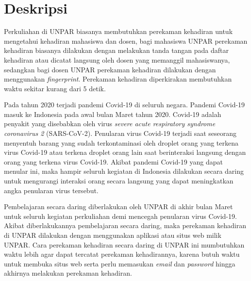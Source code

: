 \documentclass[a4paper,twoside]{article}
\begin{document}
\title{\@judultopik}
\author{\nama \textendash \@npm} 

\newcommand{\nama}{Reinalta Sugianto}
\newcommand{\@npm}{2017730035}
\newcommand{\@judultopik}{Perekaman Kehadiran Daring Otomatis} %
\newcommand{\jumpemb}{1} %
\newcommand{\tanggal}{13/10/2021}


\maketitle


\section{Deskripsi}
Perkuliahan di UNPAR biasanya membutuhkan perekaman kehadiran untuk mengetahui kehadiran mahasiswa dan dosen, bagi mahasiswa UNPAR perekaman kehadiran biasanya dilakukan dengan melakukan tanda tangan pada daftar kehadiran atau dicatat langsung oleh dosen yang memanggil mahasiswanya, sedangkan bagi dosen UNPAR perekaman kehadiran dilakukan dengan menggunakan  \textit{fingerprint}. Perekaman kehadiran diperkirakan membutuhkan waktu sekitar kurang dari 5 detik.

Pada tahun 2020 terjadi pandemi Covid-19 di seluruh negara. Pandemi Covid-19 masuk ke Indonesia pada awal bulan Maret tahun 2020. Covid-19 adalah penyakit yang disebabkan oleh virus \textit{severe acute respiratory syndrome coronavirus 2} (SARS-CoV-2). Penularan virus Covid-19 terjadi saat seseorang menyentuh barang yang sudah terkontaminasi oleh droplet orang yang terkena virus Covid-19 atau terkena droplet orang lain saat berinteraksi langsung dengan orang yang terkena virus Covid-19.  Akibat pandemi Covid-19 yang dapat menular ini, maka hampir seluruh kegiatan di Indonesia dilakukan secara daring untuk mengurangi interaksi orang secara langsung yang dapat meningkatkan angka penularan virus tersebut. 

Pembelajaran secara daring diberlakukan oleh UNPAR di akhir bulan Maret untuk seluruh kegiatan perkuliahan demi mencegah penularan virus Covid-19. Akibat diberlakukannya pembelajaran secara daring, maka perekaman kehadiran di UNPAR dilakukan dengan menggunakan aplikasi atau situs web milik UNPAR. Cara perekaman kehadiran secara daring di UNPAR ini mumbutuhkan waktu lebih agar dapat tercatat perekaman kehadirannya, karena butuh waktu untuk membuka situs web serta perlu memasukan \textit{email} dan \textit{password} hingga akhirnya melakukan perekaman kehadiran. 
\end{document}
